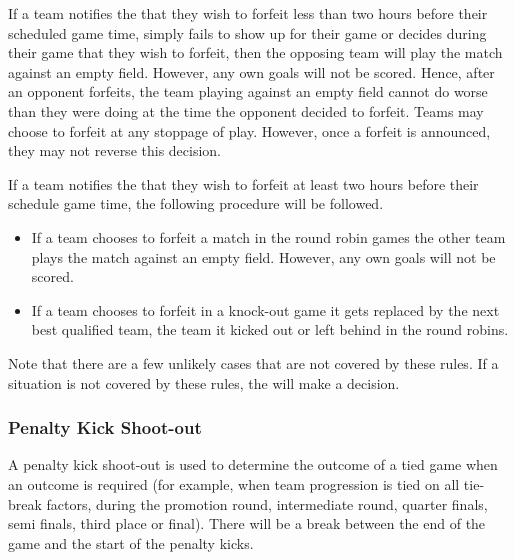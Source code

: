 If a team notifies the  that they wish to forfeit less than two hours before their scheduled game time, simply fails to show up for their game or decides during their game that they wish to forfeit, then the opposing team will play the match against an empty field. However, any own goals will not be scored. Hence, after an opponent forfeits, the team playing against an empty field cannot do worse than they were doing at the time the opponent decided to forfeit. Teams may choose to forfeit at any stoppage of play.  However, once a forfeit is announced, they may not reverse this decision.

If a team notifies the  that they wish to forfeit at least two hours before their schedule game time, the following procedure will be followed.

\begin{itemize}
\item If a team chooses to forfeit a match in the round robin games the other team plays the match against an empty field. However, any own goals will not be scored.
\item If a team chooses to forfeit in a knock-out game it gets replaced by the next best qualified team, \ie the team it kicked out or left behind in the round robins.
\end{itemize}

Note that there are a few unlikely cases that are not covered by these rules. If a situation is not covered by these rules, the  will make a decision.


\subsubsection{Penalty Kick Shoot-out}
\label{sec:penalty_shoot-out}

A penalty kick shoot-out is used to determine the outcome of a tied game when an outcome is required (for example, when team progression is tied on all tie-break factors, during the promotion round, intermediate round, quarter finals, semi finals, third place or final).
There will be a  break between the end of the game and the start of the penalty kicks. 

